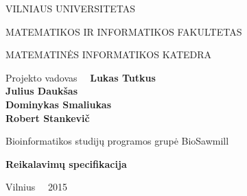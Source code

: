 \documentclass[a4paper,12pt]{article}
\begin{document}
\begin{center}
 VILNIAUS UNIVERSITETAS 
 
MATEMATIKOS IR INFORMATIKOS FAKULTETAS

MATEMATINĖS INFORMATIKOS KATEDRA

\vspace{4cm}

Projekto vadovas \ \ \textbf{Lukas Tutkus} \\
\textbf{Julius Daukšas} \\
\textbf{Dominykas Smaliukas} \\
\textbf{Robert Stankevič} \\

\vspace{0.2cm}

Bioinformatikos studijų programos grupė BioSawmill



\vspace{3cm}
\textbf{\Large Reikalavimų specifikacija}\\

\vfill

Vilnius \ \  2015
\end{center}
\end{document}
